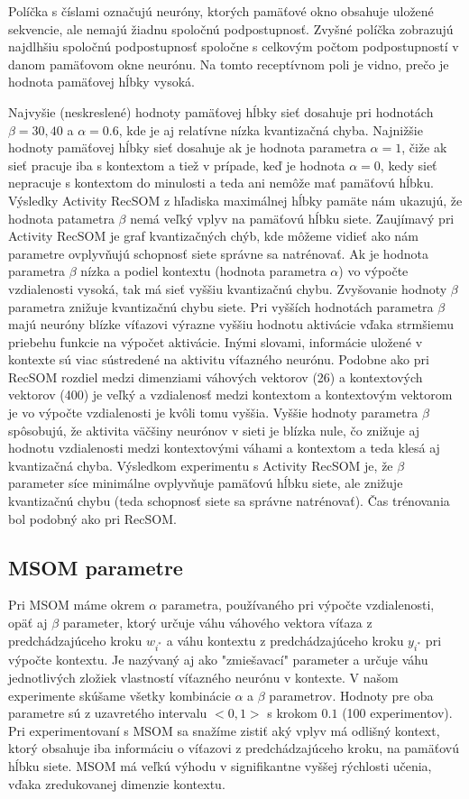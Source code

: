 Políčka s číslami označujú neuróny, ktorých pamäťové okno obsahuje uložené sekvencie, ale nemajú žiadnu 
spoločnú podpostupnosť.
Zvyšné políčka zobrazujú najdlhšiu spoločnú podpostupnosť spoločne s celkovým počtom podpostupností 
v danom pamäťovom okne neurónu. Na tomto receptívnom poli je vidno, prečo je hodnota pamäťovej hĺbky vysoká.

Najvyšie (neskreslené) hodnoty pamäťovej hĺbky sieť dosahuje pri hodnotách $\beta = 30,40$ a $\alpha = 0.6$, kde je aj relatívne nízka kvantizačná chyba.
Najnižšie hodnoty pamäťovej hĺbky sieť dosahuje ak je hodnota parametra $\alpha = 1$, čiže ak sieť pracuje iba s kontextom a tiež v prípade, keď je hodnota 
$\alpha = 0$, kedy sieť nepracuje s kontextom do minulosti a teda ani nemôže mať pamäťovú hĺbku.
Výsledky Activity RecSOM z hľadiska maximálnej hĺbky pamäte nám ukazujú, že hodnota patametra $\beta$ nemá veľký vplyv
na pamäťovú hĺbku siete.
Zaujímavý pri Activity RecSOM je graf kvantizačných chýb, kde môžeme vidieť ako nám parametre ovplyvňujú
schopnosť siete správne sa natrénovať. Ak je hodnota parametra $\beta$ nízka a podiel kontextu (hodnota parametra $\alpha$) vo 
výpočte vzdialenosti vysoká, tak má sieť vyššiu kvantizačnú chybu. Zvyšovanie hodnoty $\beta$ parametra znižuje kvantizačnú chybu siete.
Pri vyšších hodnotách parametra $\beta$ majú neuróny blízke víťazovi výrazne vyššiu hodnotu aktivácie vďaka strmšiemu priebehu funkcie na výpočet aktivácie. 
Inými slovami, informácie uložené v kontexte sú viac sústredené na aktivitu víťazného neurónu. 
Podobne ako pri RecSOM rozdiel medzi dimenziami váhových vektorov (26) a kontextových vektorov (400) je veľký a vzdialenosť medzi kontextom a kontextovým vektorom
je vo výpočte vzdialenosti je kvôli tomu vyššia. Vyššie hodnoty parametra $\beta$ spôsobujú, že aktivita väčšiny neurónov v sieti je blízka nule, čo znižuje aj hodnotu
vzdialenosti medzi kontextovými váhami a kontextom a teda klesá aj kvantizačná chyba.
Výsledkom experimentu s Activity RecSOM je, že $\beta$ parameter síce minimálne ovplyvňuje pamäťovú hĺbku siete, ale znižuje kvantizačnú chybu (teda schopnosť siete sa správne natrénovať). 
Čas trénovania bol podobný ako pri RecSOM.


\subsection{MSOM parametre}
Pri MSOM máme okrem $\alpha$ parametra, používaného pri výpočte vzdialenosti, opäť aj $\beta$ parameter, ktorý určuje váhu
váhového vektora víťaza z predchádzajúceho kroku $w_{i^{*}}$ a váhu kontextu
z predchádzajúceho kroku $y_{i^{*}}$ pri výpočte kontextu. Je nazývaný aj ako "zmiešavací" parameter
a určuje váhu jednotlivých zložiek vlastností víťazného neurónu v kontexte.
V našom experimente skúšame všetky kombinácie $\alpha$ a $\beta$ parametrov.
Hodnoty pre oba parametre sú z uzavretého intervalu $<0, 1>$ s krokom $0.1$ (100 experimentov).
Pri experimentovaní s MSOM sa snažíme zistiť aký vplyv má odlišný kontext, ktorý obsahuje iba informáciu
o víťazovi z predchádzajúceho kroku, na pamäťovú hĺbku siete. MSOM má veľkú výhodu v signifikantne 
vyššej rýchlosti učenia, vďaka zredukovanej dimenzie kontextu.


